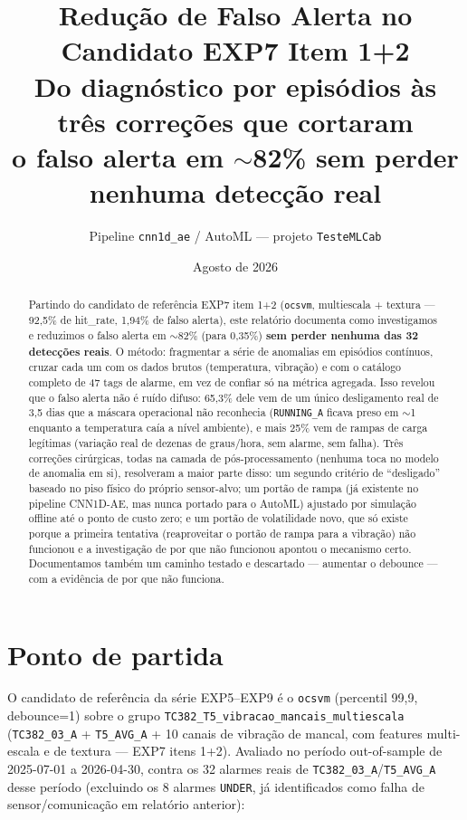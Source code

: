 \documentclass[11pt,a4paper]{article}
\title{Redução de Falso Alerta no Candidato EXP7 Item 1+2\\
\large Do diagnóstico por episódios às três correções que cortaram\\
o falso alerta em $\sim$82\% sem perder nenhuma detecção real}
\author{Pipeline \texttt{cnn1d\_ae} / AutoML --- projeto \texttt{TesteMLCab}}
\date{Agosto de 2026}
\begin{document}
\maketitle

\begin{abstract}
Partindo do candidato de referência EXP7 item 1+2 (\texttt{ocsvm},
multiescala + textura --- 92,5\% de hit\_rate, 1,94\% de falso alerta),
este relatório documenta como investigamos e reduzimos o falso alerta em
$\sim$82\% (para 0,35\%) \textbf{sem perder nenhuma das 32 detecções
reais}. O método: fragmentar a série de anomalias em episódios contínuos,
cruzar cada um com os dados brutos (temperatura, vibração) e com o
catálogo completo de 47 tags de alarme, em vez de confiar só na métrica
agregada. Isso revelou que o falso alerta não é ruído difuso: 65,3\% dele
vem de um único desligamento real de 3,5 dias que a máscara operacional
não reconhecia (\texttt{RUNNING\_A} ficava preso em $\sim$1 enquanto a
temperatura caía a nível ambiente), e mais 25\% vem de rampas de carga
legítimas (variação real de dezenas de graus/hora, sem alarme, sem
falha). Três correções cirúrgicas, todas na camada de pós-processamento
(nenhuma toca no modelo de anomalia em si), resolveram a maior parte
disso: um segundo critério de ``desligado'' baseado no piso físico do
próprio sensor-alvo; um portão de rampa (já existente no pipeline
CNN1D-AE, mas nunca portado para o AutoML) ajustado por simulação
offline até o ponto de custo zero; e um portão de volatilidade novo, que
só existe porque a primeira tentativa (reaproveitar o portão de rampa
para a vibração) não funcionou e a investigação de por que não funcionou
apontou o mecanismo certo. Documentamos também um caminho testado e
descartado --- aumentar o debounce --- com a evidência de por que não
funciona.
\end{abstract}

\tableofcontents

\section{Ponto de partida}

O candidato de referência da série EXP5--EXP9 é o \texttt{ocsvm}
(percentil 99,9, debounce=1) sobre o grupo \texttt{TC382\_T5\_vibra\-cao\_mancais\_multiescala}
(\texttt{TC382\_03\_A} + \texttt{T5\_AVG\_A} + 10 canais de vibração de
mancal, com features multi-escala e de textura --- EXP7 itens 1+2).
Avaliado no período out-of-sample de 2025-07-01 a 2026-04-30, contra os
32 alarmes reais de \texttt{TC382\_03\_A}/\texttt{T5\_AVG\_A} desse
período (excluindo os 8 alarmes \texttt{UNDER}, já identificados como
falha de sensor/comunicação em relatório anterior):
\end{document}
